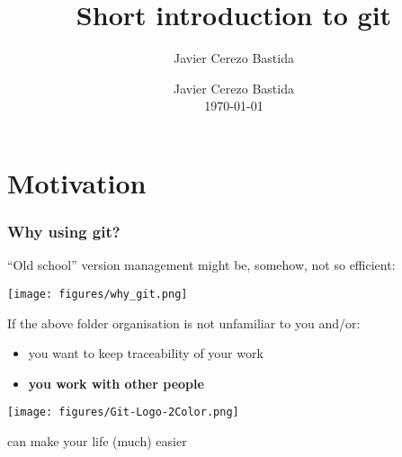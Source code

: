 \documentclass[xcolor=dvipsnames,10pt]{beamer}
\title[Intro to git]{\textbf{Short introduction to git}}
\author{Javier Cerezo Bastida}
\institute{}
\date{Javier Cerezo Bastida\\\vspace*{0.2cm}\today} %
\begin{document}
\newcommand{\wpl}{$\omega^{+}$}
\newcommand{\wm}{$\omega^{-}$}
\newcommand{\cis}{\textit{cis}}
\newcommand{\trans}{\textit{trans}}
\newcommand{\alltrans}{\textit{all-trans}}
\newcommand{\monocis}{\textit{monocis}}
\newcommand{\dicis}{\textit{dicis}}

\begin{frame}[t,plain]
  \titlepage
\end{frame}

%   

\section{Motivation}
\begin{frame}
 \frametitle{Why using git?}
 
 ``Old school'' version management might be, somehow, not so efficient:
 
 \begin{center}
 \texttt{[image: figures/why\_git.png]}  
 \end{center}
 
 \pause
 
 If the above folder organisation is not unfamiliar to you and/or:
 
 \begin{itemize}
  \item you want to keep traceability of your work
  \item \textbf{you work with other people}
 \end{itemize}

\vspace*{0.3cm}
 
 \begin{center}
 \begin{minipage}{0.2\textwidth}
  \texttt{[image: figures/Git-Logo-2Color.png]}  
 \end{minipage}
  \begin{minipage}{0.7\textwidth}
 can make your life (much) easier
  \end{minipage}
 \end{center}
  
\end{frame}
\end{document}
